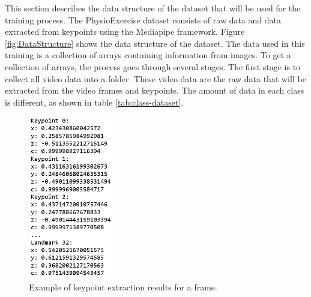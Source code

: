 This section describes the data structure of the dataset that will be used for the training process. The PhysioExercise dataset consists of raw data and data extracted from keypoints using the Mediapipe framework. Figure \ref{fig:DataStructure} shows the data structure of the dataset. The data used in this training is a collection of arrays containing information from images. To get a collection of arrays, the process goes through several stages. The first stage is to collect all video data into a folder. These video data are the raw data that will be extracted from the video frames and keypoints. The amount of data in each class is different, as shown in table \ref{tab:class-dataset}.

\begin{figure}[h!]
	\centering
	\includegraphics[width=0.33\textwidth]{bab4/ar_KeypointExtractionSample.png}
	\caption{Example of keypoint extraction results for a frame.}
	\label{fig:KeypointExtractionSample}
\end{figure}

